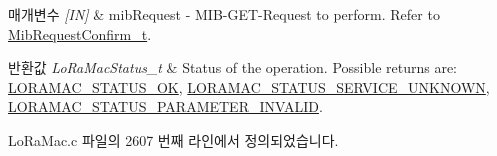 \begin{DoxyParams}{매개변수}
{\em \mbox{[}\+I\+N\mbox{]}} & mib\+Request -\/ M\+I\+B-\/\+G\+E\+T-\/\+Request to perform. Refer to \mbox{\hyperlink{group___l_o_r_a_m_a_c_ga9269d5ae88dd157a58e9d60f680d63f0}{Mib\+Request\+Confirm\+\_\+t}}.\\
\hline
\end{DoxyParams}

\begin{DoxyRetVals}{반환값}
{\em Lo\+Ra\+Mac\+Status\+\_\+t} & Status of the operation. Possible returns are\+: \mbox{\hyperlink{group___l_o_r_a_m_a_c_gga1d18f26b344040b3ec5c3db662919661a03db5fca052313edb3823c014b653a74}{L\+O\+R\+A\+M\+A\+C\+\_\+\+S\+T\+A\+T\+U\+S\+\_\+\+OK}}, \mbox{\hyperlink{group___l_o_r_a_m_a_c_gga1d18f26b344040b3ec5c3db662919661aff502a87db22d6a9a4919e4b54c7c1cf}{L\+O\+R\+A\+M\+A\+C\+\_\+\+S\+T\+A\+T\+U\+S\+\_\+\+S\+E\+R\+V\+I\+C\+E\+\_\+\+U\+N\+K\+N\+O\+WN}}, \mbox{\hyperlink{group___l_o_r_a_m_a_c_gga1d18f26b344040b3ec5c3db662919661ad0d3119f247d00e1787dda106fcb3017}{L\+O\+R\+A\+M\+A\+C\+\_\+\+S\+T\+A\+T\+U\+S\+\_\+\+P\+A\+R\+A\+M\+E\+T\+E\+R\+\_\+\+I\+N\+V\+A\+L\+ID}}. \\
\hline
\end{DoxyRetVals}


Lo\+Ra\+Mac.\+c 파일의 2607 번째 라인에서 정의되었습니다.



